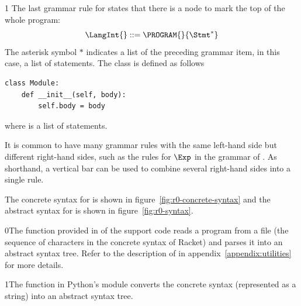 \documentclass[7x10]{TimesAPriori_MIT}%
\def\racketEd{0}
\def\pythonEd{1}
\def\edition{0}
\newcommand{\racket}[1]{{\if\edition\racketEd{#1}\fi}}
\newcommand{\python}[1]{{\if\edition\pythonEd #1\fi}}
\numberwithin{theorem}{chapter}
\numberwithin{definition}{chapter}
\numberwithin{equation}{chapter}
\begin{document}
{\if\edition\pythonEd
The last grammar rule for \LangInt{} states that there is a
 node to mark the top of the whole program:
\[
  \LangInt{} ::= \PROGRAM{}{\Stmt^{*}}
\]
The asterisk symbol $*$ indicates a list of the preceding grammar item, in
this case, a list of statements.
%
The  class is defined as follows
\begin{lstlisting}
class Module:
    def __init__(self, body):
        self.body = body
\end{lstlisting}
where  is a list of statements.
\fi}

It is common to have many grammar rules with the same left-hand side
but different right-hand sides, such as the rules for $\Exp$ in the
grammar of \LangInt{}. As shorthand, a vertical bar can be used to
combine several right-hand sides into a single rule.

The concrete syntax for \LangInt{} is shown in
figure~\ref{fig:r0-concrete-syntax} and the abstract syntax for
\LangInt{} is shown in figure~\ref{fig:r0-syntax}.

\racket{The  function provided in
  \code{utilities.rkt} of the support code reads a program from a file
  (the sequence of characters in the concrete syntax of Racket) and
  parses it into an abstract syntax tree. Refer to the description of
  \code{read-program} in appendix~\ref{appendix:utilities} for more
  details.}

\python{The  function in Python's  module
  converts the concrete syntax (represented as a string) into an
  abstract syntax tree.}

\newcommand{\LintGrammarRacket}{
  \begin{array}{rcl}
    \Type &::=& \key{Integer} \\
    \Exp{} &::=& \Int{} \MID \CREAD \MID \CNEG{\Exp} \MID \CADD{\Exp}{\Exp}
      \MID \CSUB{\Exp}{\Exp}
  \end{array}
}
\newcommand{\LintASTRacket}{
  \begin{array}{rcl}
    \Type &::=& \key{Integer} \\
    \Exp{} &::=& \INT{\Int} \MID \READ{} \\
           &\MID& \NEG{\Exp} \MID \ADD{\Exp}{\Exp} \MID \SUB{\Exp}{\Exp}
  \end{array}
}
\newcommand{\LintGrammarPython}{
\begin{array}{rcl}
  \Exp &::=& \Int \MID \key{input\_int}\LP\RP \MID \key{-}\;\Exp \MID \Exp \; \key{+} \; \Exp \MID \Exp \; \key{-} \; \Exp \MID \LP\Exp\RP \\
  \Stmt &::=& \key{print}\LP \Exp \RP \MID \Exp
\end{array}
}
\newcommand{\LintASTPython}{
  \begin{array}{rcl}
  \itm{binaryop} &::= & \code{Add()} \MID \code{Sub()} \\
  \itm{unaryop} &::= & \code{USub()} \\
  \Exp{} &::=& \INT{\Int} \MID \READ{} \\
        &\MID& \UNIOP{\itm{unaryop}}{\Exp} \MID  \BINOP{\itm{binaryop}}{\Exp}{\Exp}  \\
  \Stmt{} &::=& \PRINT{\Exp} \MID \EXPR{\Exp} 
\end{array}
}
\end{document}
